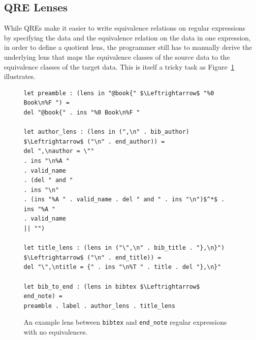\documentclass[acmsmall,review,anonymous]{acmart}\settopmatter{printfolios=true,printccs=false,printacmref=false}
\newcommand{\cd}[1]{\lstinline[backgroundcolor=\color{white}]$#1$}
\begin{document}



\subsection{QRE Lenses}
While QREs make it easier to write equivalence relations on regular expressions
by specifying the data and the equivalence relation on the data in one
expression, in order to define a quotient lens, the programmer still has to
manually derive the underlying lens that maps the equivalence classes of the
source data to the equivalence classes of the target data. This is itself a
tricky task as Figure~\ref{fig:example-lens} illustrates.

\begin{figure}[t]
\begin{lstlisting}
let preamble : (lens in "@book{" $\Leftrightarrow$ "%0 Book\n%F ") =
del "@book{" . ins "%0 Book\n%F "

let author_lens : (lens in (",\n" . bib_author) $\Leftrightarrow$ ("\n" . end_author)) =
del ",\nauthor = \""
. ins "\n%A "
. valid_name
. (del " and "
. ins "\n"
. (ins "%A " . valid_name . del " and " . ins "\n")$^*$ . ins "%A "
. valid_name
|| "")

let title_lens : (lens in ("\",\n" . bib_title . "},\n}") $\Leftrightarrow$ ("\n" . end_title)) =
del "\",\ntitle = {" . ins "\n%T " . title . del "},\n}"

let bib_to_end : (lens in bibtex $\Leftrightarrow$ end_note) =
preamble . label . author_lens . title_lens
\end{lstlisting}
\caption{An example lens between \cd{bibtex} and \cd{end_note} regular
expressions with no equivalences.}
\label{fig:example-lens}
\end{figure}
\end{document}
